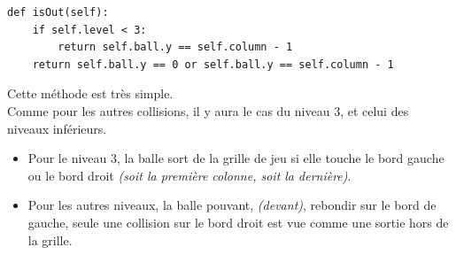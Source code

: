 \begin{verbatim}
def isOut(self):
    if self.level < 3:
        return self.ball.y == self.column - 1
    return self.ball.y == 0 or self.ball.y == self.column - 1
\end{verbatim}

Cette méthode est très simple. \\
Comme pour les autres collisions, il y aura le cas du niveau 3, et celui des
niveaux inférieurs.

\begin{itemize}

    \item Pour le niveau 3, la balle sort de la grille de jeu si elle touche
    le bord gauche ou le bord droit \textit{(soit la première colonne, soit
    la dernière)}.

    \item Pour les autres niveaux, la balle pouvant, \textit{(devant)}, rebondir
    sur le bord de gauche, seule une collision sur le bord droit est vue comme
    une sortie hors de la grille.

\end{itemize}

